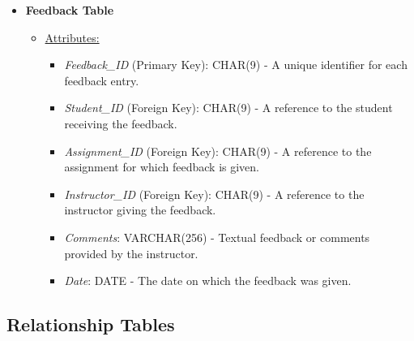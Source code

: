 \documentclass[12pt]{article}
\begin{document}
\begin{itemize}
    \item \textbf{Feedback Table}
    \begin{itemize}
        \item \underline{Attributes:}
        \begin{itemize}
            \item \textit{Feedback\_ID} (Primary Key): CHAR(9) - A unique identifier for each feedback entry.
            \item \textit{Student\_ID} (Foreign Key): CHAR(9) - A reference to the student receiving the feedback.
            \item \textit{Assignment\_ID} (Foreign Key): CHAR(9) - A reference to the assignment for which feedback is given.
            \item \textit{Instructor\_ID} (Foreign Key): CHAR(9) - A reference to the instructor giving the feedback.
            \item \textit{Comments}: VARCHAR(256) - Textual feedback or comments provided by the instructor.
            \item \textit{Date}: DATE - The date on which the feedback was given.
        \end{itemize}
    \end{itemize}    
\end{itemize}

\pagebreak

\subsection*{Relationship Tables}
\end{document}
